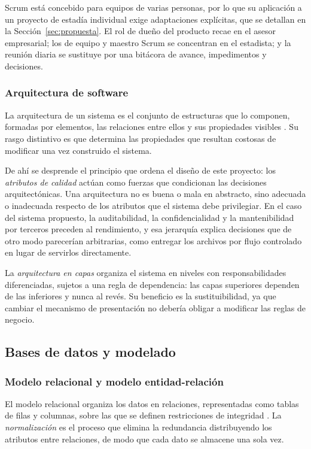 Scrum está concebido para equipos de varias personas, por lo que su aplicación a un proyecto de estadía individual exige adaptaciones explícitas, que se detallan en la Sección~\ref{sec:propuesta}. El rol de dueño del producto recae en el asesor empresarial; los de equipo y maestro Scrum se concentran en el estadista; y la reunión diaria se sustituye por una bitácora de avance, impedimentos y decisiones.

\subsubsection{Arquitectura de software}

La arquitectura de un sistema es el conjunto de estructuras que lo componen, formadas por elementos, las relaciones entre ellos y sus propiedades visibles \cite{bass2021}. Su rasgo distintivo es que determina las propiedades que resultan costosas de modificar una vez construido el sistema.

De ahí se desprende el principio que ordena el diseño de este proyecto: los \emph{atributos de calidad} actúan como fuerzas que condicionan las decisiones arquitectónicas. Una arquitectura no es buena o mala en abstracto, sino adecuada o inadecuada respecto de los atributos que el sistema debe privilegiar. En el caso del sistema propuesto, la auditabilidad, la confidencialidad y la mantenibilidad por terceros preceden al rendimiento, y esa jerarquía explica decisiones que de otro modo parecerían arbitrarias, como entregar los archivos por flujo controlado en lugar de servirlos directamente.

La \emph{arquitectura en capas} organiza el sistema en niveles con responsabilidades diferenciadas, sujetos a una regla de dependencia: las capas superiores dependen de las inferiores y nunca al revés. Su beneficio es la sustituibilidad, ya que cambiar el mecanismo de presentación no debería obligar a modificar las reglas de negocio.

\subsection{Bases de datos y modelado}
\label{subsec:mt_bases_datos}

\subsubsection{Modelo relacional y modelo entidad-re\-la\-ción}

El modelo relacional organiza los datos en relaciones, representadas como tablas de filas y columnas, sobre las que se definen restricciones de integridad \cite{elmasri2016}. La \emph{normalización} es el proceso que elimina la redundancia distribuyendo los atributos entre relaciones, de modo que cada dato se almacene una sola vez.

